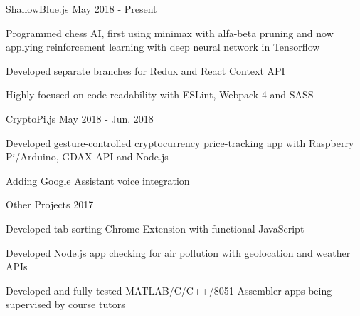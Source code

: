 \begin{cventries}
\cventryproject
{ShallowBlue.js} %
{May 2018 - Present} %
  {
    \begin{cvitems} %
      \item Programmed chess AI, first using minimax with alfa-beta pruning and now applying reinforcement learning with deep neural network in Tensorflow
      \item Developed separate branches for Redux and React Context API
      \item Highly focused on code readability with ESLint, Webpack 4 and SASS
  \end{cvitems}
  }

\cventryproject
{CryptoPi.js} %
{May 2018 - Jun. 2018} %
  {
    \begin{cvitems} %
      \item Developed gesture-controlled cryptocurrency price-tracking app with Raspberry Pi/Arduino, GDAX API and Node.js
      \item Adding Google Assistant voice integration
  \end{cvitems}
  }

\cventryproject
{Other Projects} %
{2017} %
  {
    \begin{cvitems} %
      \item Developed tab sorting Chrome Extension with functional JavaScript
      \item Developed Node.js app checking for air pollution with geolocation and weather APIs
      \item Developed and fully tested MATLAB/C/C++/8051 Assembler apps being supervised by course tutors
  \end{cvitems}
  }

\end{cventries}
